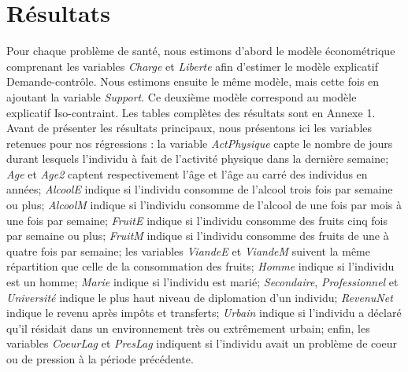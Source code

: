 \documentclass[a4paper, oneside, titlepage]{article}
\begin{document}
\section{Résultats}
Pour chaque problème de santé, nous estimons d'abord le modèle économétrique comprenant les variables \textit{Charge} et \textit{Liberte} afin d'estimer le modèle explicatif Demande-contrôle. Nous estimons ensuite le même modèle, mais cette fois en ajoutant la variable \textit{Support}. Ce deuxième modèle correspond au modèle explicatif Iso-contraint. Les tables complètes des résultats sont en Annexe 1. Avant de présenter les résultats principaux, nous présentons ici les variables retenues pour nos régressions : la variable \textit{ActPhysique} capte le nombre de jours durant lesquels l'individu à fait de l'activité physique dans la dernière semaine; \textit{Age} et \textit{Age2} captent respectivement l'âge et l'âge au carré des individus en années; \textit{AlcoolE} indique si l'individu consomme de l'alcool trois fois par semaine ou plus; \textit{AlcoolM} indique si l'individu consomme de l'alcool de une fois par mois à une fois par semaine; \textit{FruitE} indique si l'individu consomme des fruits cinq fois par semaine ou plus; \textit{FruitM} indique si l'individu consomme des fruits de une à quatre fois par semaine; les variables \textit{ViandeE} et \textit{ViandeM} suivent la même répartition que celle de la consommation des fruits; \textit{Homme} indique si l'individu est un homme; \textit{Marie} indique si l'individu est marié; \textit{Secondaire}, \textit{Professionnel} et \textit{Université} indique le plus haut niveau de diplomation d'un individu; \textit{RevenuNet} indique le revenu après impôts et transferts; \textit{Urbain} indique si l'individu a déclaré qu'il résidait dans un environnement très ou extrêmement urbain; enfin, les variables \textit{CoeurLag} et \textit{PresLag} indiquent si l'individu avait un problème de coeur ou de pression à la période précédente. 
\end{document}
